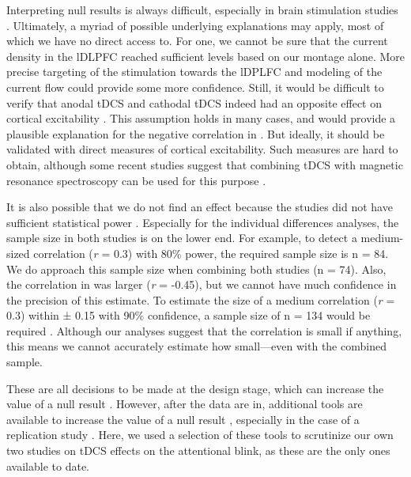 \documentclass[11pt,english,]{memoir}
\begin{document}
Interpreting null results is always difficult, especially in brain stimulation studies \autocite{DeGraaf2018}. Ultimately, a myriad of possible underlying explanations may apply, most of which we have no direct access to. For one, we cannot be sure that the current density in the lDLPFC reached sufficient levels \autocites{Kim2014}{Opitz2015} based on our montage alone. More precise targeting of the stimulation towards the lDPLFC \autocite{Datta2009} and modeling of the current flow \autocites{DeBerker2013}{Karabanov2019} could provide some more confidence. Still, it would be difficult to verify that anodal tDCS and cathodal tDCS indeed had an opposite effect on cortical excitability \autocites{Bestmann2014}{Bestmann2017}. This assumption holds in many cases, and would provide a plausible explanation \autocite{Krause2014} for the negative correlation in \textcite{London2015}. But ideally, it should be validated with direct measures of cortical excitability. Such measures are hard to obtain, although some recent studies suggest that combining tDCS with magnetic resonance spectroscopy can be used for this purpose \autocites{Filmer2019}{Antonenko2019}{Talsma2018}.

It is also possible that we do not find an effect because the studies did not have sufficient statistical power \autocite{Minarik2016}. Especially for the individual differences analyses, the sample size in both studies is on the lower end. For example, to detect a medium-sized correlation (\emph{r} = 0.3) with 80\% power, the required sample size is n = 84. We do approach this sample size when combining both studies (n = 74). Also, the correlation in \textcite{London2015} was larger (\emph{r} = -0.45), but we cannot have much confidence in the precision of this estimate. To estimate the size of a medium correlation (\emph{r} = 0.3) within ± 0.15 with 90\% confidence, a sample size of n = 134 would be required \autocite{Schonbrodt2013}. Although our analyses suggest that the correlation is small if anything, this means we cannot accurately estimate how small---even with the combined sample.

These are all decisions to be made at the design stage, which can increase the value of a null result \autocite{DeGraaf2018}. However, after the data are in, additional tools are available to increase the value of a null result \autocite{Harms2018}, especially in the case of a replication study \autocite{Simonsohn2015}. Here, we used a selection of these tools to scrutinize our own two studies on tDCS effects on the attentional blink, as these are the only ones available to date.
\end{document}
